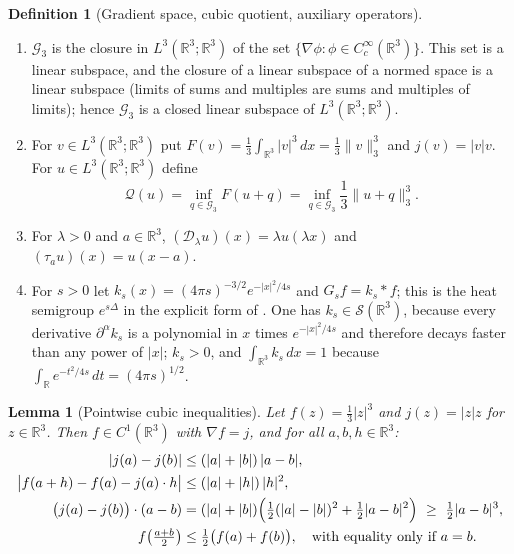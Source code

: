 \documentclass[11pt]{article}
\newtheorem{lemma}[theorem]{Lemma}
\theoremstyle{definition}
\newtheorem{definition}[theorem]{Definition}
\theoremstyle{plain}
\newcommand{\R}{\mathbb R}
\newcommand{\norm}[1]{\lVert #1\rVert}
\begin{document}
\begin{definition}[Gradient space, cubic quotient, auxiliary operators]
\label{def:quotient}\leavevmode
\begin{enumerate}
\item[(a)] $\mathcal G_3$ is the closure in $L^3(\R^3;\R^3)$ of the set
 $\{\nabla\phi:\phi\in C_c^\infty(\R^3)\}$.  This set is a linear
 subspace, and the closure of a linear subspace of a normed space is a
 linear subspace (limits of sums and multiples are sums and multiples of
 limits); hence $\mathcal G_3$ is a closed linear subspace of
 $L^3(\R^3;\R^3)$.
\item[(b)] For $v\in L^3(\R^3;\R^3)$ put
 $F(v)=\frac13\int_{\R^3}|v|^3\,dx=\frac13\norm v_3^3$ and $j(v)=|v|v$.
 For $u\in L^3(\R^3;\R^3)$ define
 \[
  \mathcal Q(u)=\inf_{q\in\mathcal G_3}F(u+q)
  =\inf_{q\in\mathcal G_3}\frac13\norm{u+q}_3^3 .
 \]
\item[(c)] For $\lambda>0$ and $a\in\R^3$, $(\mathcal D_\lambda u)(x)=\lambda u(\lambda x)$
 and $(\tau_au)(x)=u(x-a)$.
\item[(d)] For $s>0$ let $k_s(x)=(4\pi s)^{-3/2}e^{-|x|^2/4s}$ and
 $G_sf=k_s*f$; this is the heat semigroup $e^{s\Delta}$ in the explicit
 form of \cite[p.~39]{Tao2013}.  One has $k_s\in\mathcal S(\R^3)$, because
 every derivative $\partial^\alpha k_s$ is a polynomial in $x$ times
 $e^{-|x|^2/4s}$ and therefore decays faster than any power of $|x|$;
 $k_s>0$, and $\int_{\R^3}k_s\,dx=1$ because
 $\int_{\R}e^{-t^2/4s}\,dt=(4\pi s)^{1/2}$.
\end{enumerate}
\end{definition}

\begin{lemma}[Pointwise cubic inequalities]\label{lem:cubic-pointwise}
Let $f(z)=\frac13|z|^3$ and $j(z)=|z|z$ for $z\in\R^3$.  Then
$f\in C^1(\R^3)$ with $\nabla f=j$, and for all $a,b,h\in\R^3$:
\begin{align}
 |j(a)-j(b)|&\le(|a|+|b|)\,|a-b|,
 \label{eq:cp-lipschitz}\\
 \bigl|f(a+h)-f(a)-j(a)\cdot h\bigr|&\le(|a|+|h|)\,|h|^2,
 \label{eq:cp-taylor}\\
 \bigl(j(a)-j(b)\bigr)\cdot(a-b)
 &=(|a|+|b|)\Bigl(\tfrac12(|a|-|b|)^2+\tfrac12|a-b|^2\Bigr)
 \ \ge\ \tfrac12|a-b|^3,
 \label{eq:cp-monotone}\\
 f\!\left(\tfrac{a+b}2\right)&\le\tfrac12\bigl(f(a)+f(b)\bigr),
 \quad\text{with equality only if }a=b.
 \label{eq:cp-strict}
\end{align}
\end{lemma}
\end{document}
